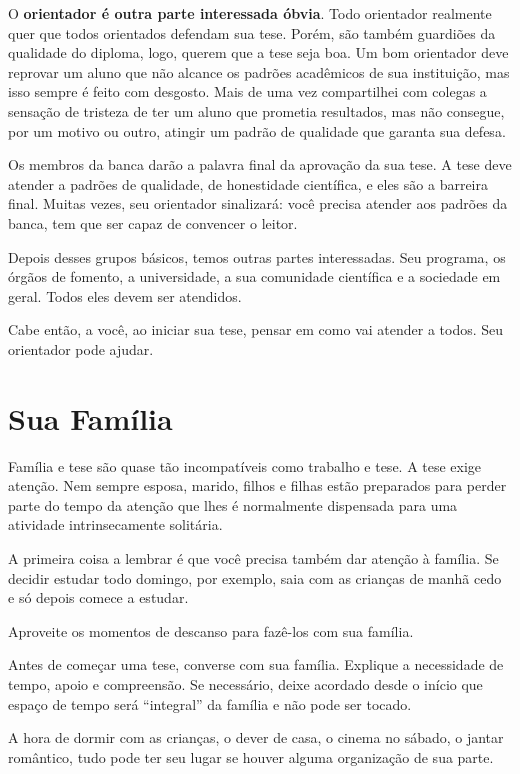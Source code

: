 O \textbf{orientador é outra parte interessada óbvia}. Todo orientador realmente quer que todos orientados defendam sua tese. Porém, são também guardiões da qualidade do diploma, logo, querem que a tese seja boa. Um bom orientador deve reprovar um aluno que não alcance os padrões acadêmicos de sua instituição, mas isso sempre é feito com desgosto. Mais de uma vez compartilhei com colegas a sensação de tristeza de ter um aluno que prometia resultados, mas não consegue, por um motivo ou outro, atingir um padrão de qualidade que garanta sua defesa.

Os membros da banca darão a palavra final da aprovação da sua tese. A tese deve atender a padrões de qualidade, de honestidade científica, e eles são a barreira final. Muitas vezes, seu orientador sinalizará: você precisa atender aos padrões da banca, tem que ser capaz de convencer o leitor.

Depois desses grupos básicos, temos outras partes interessadas. Seu programa, os órgãos de fomento, a universidade, a sua comunidade científica e a sociedade em geral. Todos eles devem ser atendidos. 

Cabe então, a você, ao iniciar sua tese, pensar em como vai atender a todos. Seu orientador pode ajudar.

\section{Sua Família}
Família e tese são quase tão incompatíveis como trabalho e tese. A tese exige atenção. Nem sempre esposa, marido, filhos e filhas estão preparados para perder parte do tempo da atenção que lhes é normalmente dispensada para uma atividade intrinsecamente solitária.

A primeira coisa a lembrar é que você precisa também dar atenção à família. Se decidir estudar todo domingo, por exemplo, saia com as crianças de manhã cedo e só depois comece a estudar. 

Aproveite os momentos de descanso para fazê-los com sua família. 

Antes de começar uma tese, converse com sua família. Explique a necessidade de tempo, apoio e compreensão. Se necessário, deixe acordado desde o início que espaço de tempo será ``integral'' da família e não pode ser tocado. 

A hora de dormir com as crianças, o dever de casa, o cinema no sábado, o jantar romântico, tudo pode ter seu lugar se houver alguma organização de sua parte. 

